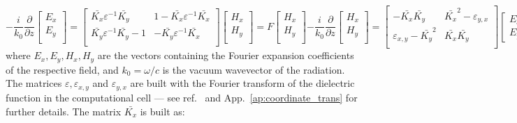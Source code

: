 \documentclass[a4paper,10pt]{report}
\begin{document}
\begin{subequations} \label{eq:def_sys}
\begin{equation} \label{eq:def_F}
-\frac{i}{k_0} \frac{\partial}{\partial z} 
\left[ \begin{array}{c}
E_x \\ E_y \\
\end{array} \right] = 
\left[ \begin{array}{cc}
\bar{K_x} \varepsilon^{-1} \bar{K_y}    & 1- \bar{K_x} \varepsilon^{-1} \bar{K_x} \\
\bar{K_y} \varepsilon^{-1} \bar{K_y} -1 &   -\bar{K_y} \varepsilon^{-1} \bar{K_x} \\
\end{array} \right]
\left[ \begin{array}{c}
 H_x \\ H_y \\
\end{array} \right] 
= F \left[ \begin{array}{c}
 H_x \\ H_y \\
\end{array} \right] 
 \end{equation}
\begin{equation} \label{eq:def_G}
-\frac{i}{k_0} \frac{\partial}{\partial z} 
\left[ \begin{array}{c}
H_x \\ H_y \\
\end{array} \right] = 
\left[ \begin{array}{cc}
 -\bar{K_x} \bar{K_y} & \bar{K_x}^2 - \varepsilon_{y,x} \\
 \varepsilon_{x,y} - \bar{K_y}^2 & \bar{K_x} \bar{K_y} \\
\end{array} \right]
\left[ \begin{array}{c}
E_x \\ E_y
\end{array} \right]
= G \left[ \begin{array}{c}
E_x \\ E_y
\end{array} \right]
\end{equation}
\end{subequations}
where $E_x,E_y,H_x,H_y$ are the vectors containing the Fourier expansion coefficients of the respective field, and $k_0= \omega/c$ is the vacuum wavevector of the radiation. The matrices $\varepsilon, \varepsilon_{x,y}$ and $\varepsilon_{y,x}$ are built with the Fourier transform of the dielectric function in the computational cell --- see ref.~\cite{li1997new} and App.~\ref{ap:coordinate_trans} for further details. The matrix $\bar{K_x}$ is built as:
\end{document}
